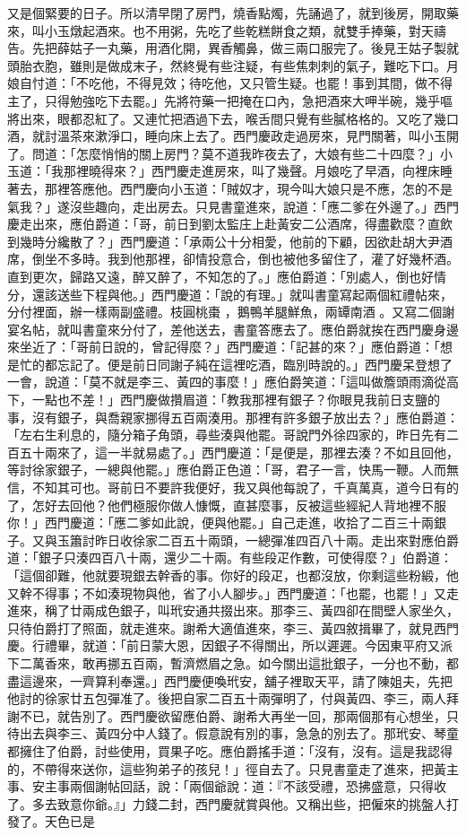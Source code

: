 又是個緊要的日子。所以清早閉了房門，燒香點燭，先誦過了，就到後房，開取藥來，叫小玉燉起酒來。也不用粥，先吃了些乾糕餅食之類，就雙手捧藥，對天禱告。先把薛姑子一丸藥，用酒化開，異香觸鼻，做三兩口服完了。後見王姑子製就頭胎衣胞，雖則是做成末子，然終覺有些注疑，有些焦刺刺的氣子，難吃下口。月娘自忖道：「不吃他，不得見效；待吃他，又只管生疑。也罷！事到其間，做不得主了，只得勉強吃下去罷。」先將符藥一把掩在口內，急把酒來大呷半碗，幾乎嘔將出來，眼都忍紅了。又連忙把酒過下去，喉舌間只覺有些膩格格的。又吃了幾口酒，就討溫茶來漱淨口，睡向床上去了。西門慶政走過房來，見門關著，叫小玉開了。問道：「怎麼悄悄的關上房門？莫不道我昨夜去了，大娘有些二十四麼？」小玉道：「我那裡曉得來？」西門慶走進房來，叫了幾聲。月娘吃了早酒，向裡床睡著去，那裡答應他。西門慶向小玉道：「賊奴才，現今叫大娘只是不應，怎的不是氣我？」遂沒些趣向，走出房去。只見書童進來，說道：「應二爹在外邊了。」西門慶走出來，應伯爵道：「哥，前日到劉太監庄上赴黃安二公酒席，得盡歡麼？直飲到幾時分纔散了？」西門慶道：「承兩公十分相愛，他前的下顧，因欲赴胡大尹酒席，倒坐不多時。我到他那裡，卻情投意合，倒也被他多留住了，灌了好幾杯酒。直到更次，歸路又遠，醉又醉了，不知怎的了。」應伯爵道：「別處人，倒也好情分，還該送些下程與他。」西門慶道：「說的有理。」就叫書童寫起兩個紅禮帖來，分付裡面，辦一樣兩副盛禮。枝圓桃棗 ，鵝鴨羊腿鮮魚，兩罈南酒 。又寫二個謝宴名帖，就叫書童來分付了，差他送去，書童答應去了。應伯爵就挨在西門慶身邊來坐近了：「哥前日說的，曾記得麼？」西門慶道：「記甚的來？」應伯爵道：「想是忙的都忘記了。便是前日同謝子純在這裡吃酒，臨別時說的。」西門慶呆登想了一會，說道：「莫不就是李三、黃四的事麼！」應伯爵笑道：「這叫做簷頭雨滴從高下，一點也不差！」西門慶做攢眉道：「教我那裡有銀子？你眼見我前日支鹽的事，沒有銀子，與喬親家挪得五百兩湊用。那裡有許多銀子放出去？」應伯爵道：「左右生利息的，隨分箱子角頭，尋些湊與他罷。哥說門外徐四家的，昨日先有二百五十兩來了，這一半就易處了。」西門慶道：「是便是，那裡去湊？不如且回他，等討徐家銀子，一總與他罷。」應伯爵正色道：「哥，君子一言，快馬一鞭。人而無信，不知其可也。哥前日不要許我便好，我又與他每說了，千真萬真，道今日有的了，怎好去回他？他們極服你做人慷慨，直甚麼事，反被這些經紀人背地裡不服你！」西門慶道：「應二爹如此說，便與他罷。」自己走進，收拾了二百三十兩銀子。又與玉簫討昨日收徐家二百五十兩頭，一總彈准四百八十兩。走出來對應伯爵道：「銀子只湊四百八十兩，還少二十兩。有些段疋作數，可使得麼？」伯爵道：「這個卻難，他就要現銀去幹香的事。你好的段疋，也都沒放，你剩這些粉緞，他又幹不得事；不如湊現物與他，省了小人腳步。」西門慶道：「也罷，也罷！」又走進來，稱了廿兩成色銀子，叫玳安通共掇出來。那李三、黃四卻在間壁人家坐久，只待伯爵打了照面，就走進來。謝希大適值進來，李三、黃四敘揖畢了，就見西門慶。行禮畢，就道：「前日蒙大恩，因銀子不得關出，所以遲遲。今因東平府又派下二萬香來，敢再挪五百兩，暫濟燃眉之急。如今關出這批銀子，一分也不動，都盡這邊來，一齊算利奉還。」西門慶便喚玳安，舖子裡取天平，請了陳姐夫，先把他討的徐家廿五包彈准了。後把自家二百五十兩彈明了，付與黃四、李三，兩人拜謝不已，就告別了。西門慶欲留應伯爵、謝希大再坐一回，那兩個那有心想坐，只待出去與李三、黃四分中人錢了。假意說有別的事，急急的別去了。那玳安、琴童都擁住了伯爵，討些使用，買果子吃。應伯爵搖手道：「沒有，沒有。這是我認得的，不帶得來送你，這些狗弟子的孩兒！」徑自去了。只見書童走了進來，把黃主事、安主事兩個謝帖回話，說：「兩個爺說：道：『不該受禮，恐拂盛意，只得收了。多去致意你爺。』」力錢二封，西門慶就賞與他。又稱出些，把僱來的挑盤人打發了。天色已是